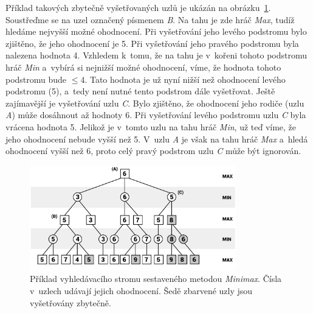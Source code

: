 Příklad takových zbytečně vyšetřovaných uzlů je ukázán na obrázku~\ref{fig:alpha-beta-pruning}. Soustřeďme se na uzel označený písmenem \emph{B}. Na tahu je zde hráč \emph{Max}, tudíž hledáme nejvyšší možné ohodnocení. Při vyšetřování jeho levého podstromu bylo zjištěno, že jeho ohodnocení je 5. Při vyšetřování jeho pravého podstromu byla nalezena hodnota 4. Vzhledem k~tomu, že na tahu je v~kořeni tohoto podstromu hráč \emph{Min} a~vybírá si nejnižší možné ohodnocení, víme, že hodnota tohoto podstromu bude $\leq 4$. Tato hodnota je už nyní nižší než ohodnocení levého podstromu (5), a~tedy není nutné tento podstrom dále vyšetřovat. Ještě zajímavější je vyšetřování uzlu \emph{C}. Bylo zjištěno, že ohodnocení jeho rodiče (uzlu \emph{A}) může dosáhnout až hodnoty 6. Při vyšetřování levého podstromu uzlu \emph{C} byla vrácena hodnota 5. Jelikož je v~tomto uzlu na tahu hráč \emph{Min}, už teď víme, že jeho ohodnocení nebude vyšší než 5. V~uzlu \emph{A} je však na tahu hráč \emph{Max} a~hledá ohodnocení vyšší než 6, proto celý pravý podstrom uzlu \emph{C} může být ignorován.

\begin{figure}[ht]
    \centering
    \includegraphics[width=0.8\textwidth]{obrazky-figures/ab-pruning.pdf}
    \caption{Příklad vyhledávacího stromu \cite{ab_pruning} sestaveného metodou \emph{Minimax}. Čísla v~uzlech udávají jejich ohodnocení. Šedě zbarvené uzly jsou vyšetřovány zbytečně.}
    \label{fig:alpha-beta-pruning}
\end{figure}

